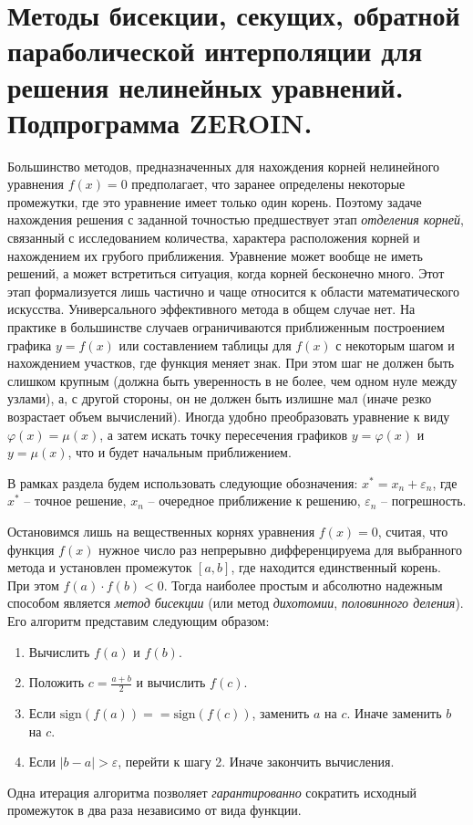 \section{Методы бисекции, секущих, обратной параболической интерполяции для решения нелинейных уравнений. Подпрограмма \textbf{ZEROIN}.}\label{sec:ch22}
Большинство методов, предназначенных для нахождения корней нелинейного уравнения $f(x) = 0$ предполагает, что заранее
определены некоторые промежутки, где это уравнение имеет только один корень. Поэтому задаче нахождения решения с
заданной точностью предшествует этап \emph{отделения корней}, связанный с исследованием количества, характера
расположения корней и нахождением их грубого приближения. Уравнение может вообще не иметь решений, а может встретиться
ситуация, когда корней бесконечно много. Этот этап формализуется лишь частично и чаще относится к области математического
искусства. Универсального эффективного метода в общем случае нет. На практике в большинстве случаев ограничиваются
приближенным построением графика $y = f(x)$ или составлением таблицы для $f(x)$ с некоторым шагом и нахождением участков,
где функция меняет знак. При этом шаг не должен быть слишком крупным (должна быть уверенность в не более, чем одном нуле
между узлами), а, с другой стороны, он не должен быть излишне мал (иначе резко возрастает объем вычислений). Иногда
удобно преобразовать уравнение к виду $\displaystyle \varphi(x) = \mu(x)$, а затем искать точку пересечения графиков
$y = \varphi(x)$ и $y = \mu(x)$, что и будет начальным приближением.

В рамках раздела будем использовать следующие обозначения: $x^{*} = x_n + \varepsilon_n$, где $x^{*}$ -- точное решение, $x_n$ --
очередное приближение к решению, $\varepsilon_n$ -- погрешность.

Остановимся лишь на вещественных корнях уравнения $f(x) = 0$, считая, что функция $f(x)$ нужное число раз непрерывно
дифференцируема для выбранного метода и установлен промежуток $[a, b]$, где находится единственный корень. При этом
$\displaystyle f(a) \cdot f(b) < 0$. Тогда наиболее простым и абсолютно надежным способом является \emph{метод бисекции}
(или метод \emph{дихотомии}, \emph{половинного деления}). Его алгоритм представим следующим образом:
\begin{enumerate}
    \item Вычислить $f(a)$ и $f(b)$.
    \item Положить $\displaystyle c = \frac{a + b}{2}$ и вычислить $f(c)$.
    \item Если $\text{sign}\left( f(a) \right) == \text{sign}\left( f(c) \right)$, заменить $a$ на $c$. Иначе заменить $b$ на $c$.
    \item Если $\displaystyle |b - a| > \varepsilon$, перейти к шагу 2. Иначе закончить вычисления.
\end{enumerate}
Одна итерация алгоритма позволяет \emph{гарантированно} сократить исходный промежуток в два раза независимо от вида
функции.

